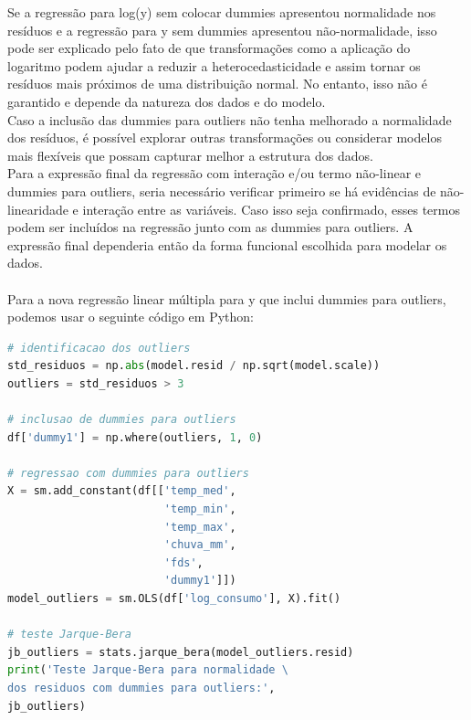 \documentclass[a4paper, 12pt]{article}
\begin{document}
Se a regressão para log(y) sem colocar dummies apresentou normalidade nos resíduos e a regressão para y sem dummies apresentou não-normalidade, isso pode ser explicado pelo fato de que transformações como a aplicação do logaritmo podem ajudar a reduzir a heterocedasticidade e assim tornar os resíduos mais próximos de uma distribuição normal. No entanto, isso não é garantido e depende da natureza dos dados e do modelo.\\

Caso a inclusão das dummies para outliers não tenha melhorado a normalidade dos resíduos, é possível explorar outras transformações ou considerar modelos mais flexíveis que possam capturar melhor a estrutura dos dados.\\

Para a expressão final da regressão com interação e/ou termo não-linear e dummies para outliers, seria necessário verificar primeiro se há evidências de não-linearidade e interação entre as variáveis. Caso isso seja confirmado, esses termos podem ser incluídos na regressão junto com as dummies para outliers. A expressão final dependeria então da forma funcional escolhida para modelar os dados.\\ \\

Para a nova regressão linear múltipla para y que inclui dummies para outliers, podemos usar o seguinte código em Python:\\


\begin{tcolorbox}[colback=white,boxrule=1pt,arc=5pt,auto outer arc]
  \begin{lstlisting}[language=Python]
# identificacao dos outliers
std_residuos = np.abs(model.resid / np.sqrt(model.scale))
outliers = std_residuos > 3

# inclusao de dummies para outliers
df['dummy1'] = np.where(outliers, 1, 0)

# regressao com dummies para outliers
X = sm.add_constant(df[['temp_med', 
                        'temp_min', 
                        'temp_max', 
                        'chuva_mm', 
                        'fds', 
                        'dummy1']])
model_outliers = sm.OLS(df['log_consumo'], X).fit()

# teste Jarque-Bera
jb_outliers = stats.jarque_bera(model_outliers.resid)
print('Teste Jarque-Bera para normalidade \
dos residuos com dummies para outliers:', 
jb_outliers)
    \end{lstlisting}
\end{tcolorbox} \\
\end{document}
